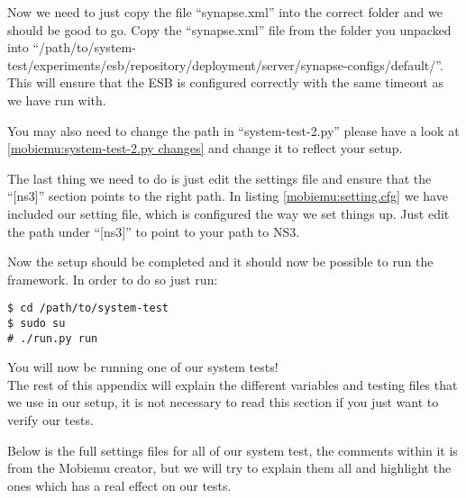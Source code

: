 Now we need to just copy the file “synapse.xml” into the correct folder and we should be good to go. Copy the “synapse.xml” file from the folder you unpacked into “/path/to/system-test/experiments/esb/repository/deployment/server/synapse-configs/default/”. This will ensure that the ESB is configured correctly with the same timeout as we have run with.

You may also need to change the path in “system-test-2.py” please have a look at \ref{mobiemu:system-test-2.py changes} and change it to reflect your setup.

The last thing we need to do is just edit the settings file and ensure that the “[ns3]” section points to the right path. In listing \ref{mobiemu:setting.cfg} we have included our setting file, which is configured the way we set things up. Just edit the path under “[ns3]” to point to your path to NS3.

Now the setup should be completed and it should now be possible to run the framework. In order to do so just run:
\lstset{language=bash}
\begin{lstlisting}[frame=single, caption={Run Mobiemu}, label=mobiemu:run, breaklines=true]
$ cd /path/to/system-test
$ sudo su
# ./run.py run
\end{lstlisting}

You will now be running one of our system tests!\\

The rest of this appendix will explain the different variables and testing files that we use in our setup, it is not necessary to read this section if you just want to verify our tests.

Below is the full settings files for all of our system test, the comments within it is from the Mobiemu creator, but we will try to explain them all and highlight the ones which has a real effect on our tests.

